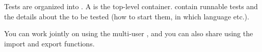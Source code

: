 
Tests are organized into \gdprojects{}. 
A \gdproject{} is the top-level container. \gdprojects{} contain runnable tests and the details about the \gdauts{} to be tested  (how to start them, in which language etc.). 

You can work jointly on \gdprojects{} using the multi-user \gddb{}, and you can also share \gdprojects{} using the import and export functions. 
